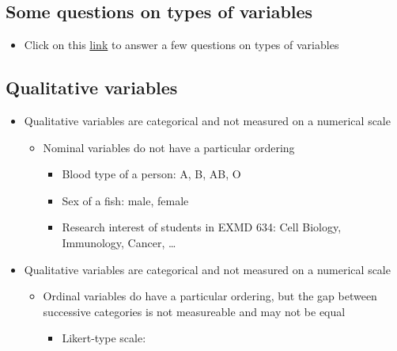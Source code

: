\documentclass[
]{book}
\providecommand{\tightlist}{%
  \setlength{\itemsep}{0pt}\setlength{\parskip}{0pt}}
\begin{document}
\hypertarget{some-questions-on-types-of-variables}{%
\subsection{Some questions on types of variables}\label{some-questions-on-types-of-variables}}

\begin{itemize}
\tightlist
\item
  Click on this \href{https://forms.office.com/Pages/ResponsePage.aspx?id=cZYxzedSaEqvqfz4-J8J6vtaSwoU68FCgvKfzwN_XcBURFJJUTFWN05JRTJGRzU0WUw3MzIwMlJEUy4u}{link} to answer a few questions on types of variables
\end{itemize}

\hypertarget{qualitative-variables}{%
\subsection{Qualitative variables}\label{qualitative-variables}}

\begin{itemize}
\tightlist
\item
  Qualitative variables are categorical and not measured on a numerical scale

  \begin{itemize}
  \tightlist
  \item
    Nominal variables do not have a particular ordering

    \begin{itemize}
    \tightlist
    \item
      Blood type of a person: A, B, AB, O
    \item
      Sex of a fish: male, female
    \item
      Research interest of students in EXMD 634:
      Cell Biology, Immunology, Cancer, \ldots{}
    \end{itemize}
  \end{itemize}
\item
  Qualitative variables are categorical and not measured on a numerical scale

  \begin{itemize}
  \tightlist
  \item
    Ordinal variables do have a particular ordering, but the gap between successive categories is not measureable and may not be equal

    \begin{itemize}
    \tightlist
    \item
      Likert-type scale:
    \end{itemize}
  \end{itemize}
\end{itemize}
\end{document}
